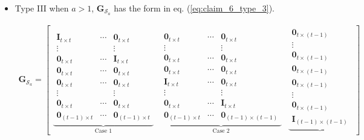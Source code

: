 \documentclass[journal,twocolumn]{IEEEtran}
\theoremstyle{definition}
\newcommand{\calS}{\mathcal{S}}
\newcommand{\bfG}{\mathbf{G}}
\newcommand{\bfI}{\mathbf{I}}
\newcommand{\bfzr}{\mathbf{0}}
\newcommand{\aditya}[1]{\marginpar{+}{\bf Aditya's remark}: {\em #1}}
\newcommand{\litang}[1]{\marginpar{+}{\bf Li's remark}: {\em #1}}
\begin{document}
\begin{itemize}
	\item Type III
	when $a>1$, $\bfG_{\calS_a}$ has the form in eq. (\ref{eq:claim_6_type_3}). %
	\begin{table*}
	\begin{align}
		\bfG_{\calS_a}=
		\begin{bmatrix}
		\underbrace{
		\begin{array}{ccc}
		\bfI_{t\times t}& \cdots& \bfzr_{t\times t}\\
		\vdots&&\vdots\\
		\bfzr_{t\times t}& \cdots& \bfI_{t\times t}\\
		\bfzr_{t\times t}& \cdots& \bfzr_{t\times t}\\
		\bfzr_{t\times t}& \cdots& \bfzr_{t\times t}\\
		\vdots&&\vdots\\
		\bfzr_{t\times t}& \cdots& \bfzr_{t\times t}\\
		\bfzr_{(t-1)\times t}& \cdots& \bfzr_{(t-1)\times t}	
		\end{array}
	    }_{\text{Case 1}}
	    &
	    \underbrace{
	    	\begin{array}{ccc}
	    	\bfzr_{t\times t} &\cdots&\bfzr_{t\times t}\\
	    	\vdots&&\vdots\\
	    	\bfzr_{t\times t} &\cdots&\bfzr_{t\times t}\\
	    	\bfzr_{t\times t} &\cdots&\bfzr_{t\times t}\\
	    	\bfI_{t\times t} &\cdots&\bfzr_{t\times t}\\
	    	\vdots&&\vdots\\
	    	\bfzr_{t\times t}& \cdots& \bfI_{t\times t}\\
	    	\bfzr_{(t-1)\times t} &\cdots&\bfzr_{(t-1)\times (t-1)}	
	    	\end{array}
	    }_{\text{Case 2}}
	    &
	    \underbrace{
	    	\begin{array}{c}
	    	\bfzr_{t\times (t-1)}\\
	    	\vdots\\
	    	\bfzr_{t\times (t-1)}\\
	    	\bfzr_{t\times (t-1)}\\
	    	\bfzr_{t\times (t-1)}\\
	    	\vdots\\
	    	\bfzr_{t\times (t-1)}\\
	    	\bfI_{(t-1)\times (t-1)}
	    	\end{array}
}
\end{bmatrix}
\end{align}
\end{table*}
\end{itemize}
\end{document}
